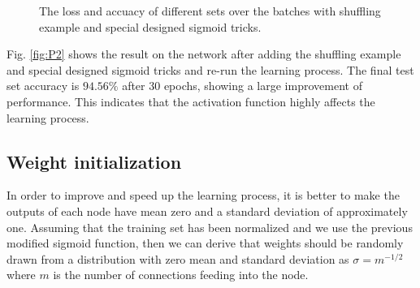 \documentclass{article} %
\begin{document}
\begin{figure} [!htbp]
	
	\caption{The loss and accuacy of different sets over the batches with shuffling example and special designed sigmoid tricks. }  
	\label{fig:P3}
\end{figure}

Fig. \ref{fig:P2} shows the result on the network after adding the shuffling example and special designed sigmoid tricks and re-run the learning process. The final test set accuracy is $94.56\%$ after 30 epochs, showing a large improvement of performance. This indicates that the activation function highly affects the learning process.

\subsection{Weight initialization}
In order to improve and speed up the learning process, it is better to make the outputs of each node have mean zero and a standard deviation of approximately one. Assuming that the training set has been normalized and we use the previous modified sigmoid function, then we can derive that weights should be randomly drawn from a distribution with zero mean and standard deviation as $\sigma = m^{-1/2}$ where $m$ is the number of connections feeding into the node. 
\end{document}
